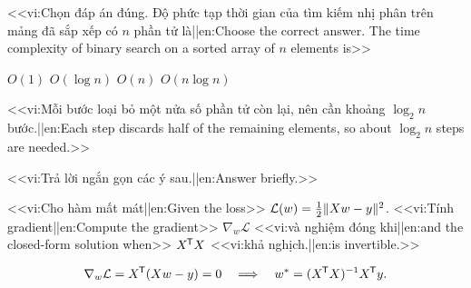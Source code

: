 \documentclass[11pt,a4paper,addpoints]{exam}
\begin{document}
\begin{questions}

\question[2]
<<vi:Chọn đáp án đúng. Độ phức tạp thời gian của tìm kiếm nhị phân trên mảng đã sắp xếp có $n$ phần tử là||en:Choose the correct answer. The time complexity of binary search on a sorted array of $n$ elements is>>
\begin{choices}
  \choice $O(1)$
  \CorrectChoice $O(\log n)$
  \choice $O(n)$
  \choice $O(n \log n)$
\end{choices}
\begin{solution}
<<vi:Mỗi bước loại bỏ một nửa số phần tử còn lại, nên cần khoảng $\log_2 n$ bước.||en:Each step discards half of the remaining elements, so about $\log_2 n$ steps are needed.>>
\end{solution}

\question <<vi:Trả lời ngắn gọn các ý sau.||en:Answer briefly.>>

\question[3]
<<vi:Cho hàm mất mát||en:Given the loss>> $\mathcal{L}(w) = \frac{1}{2}\lVert Xw - y\rVert^2$. <<vi:Tính gradient||en:Compute the gradient>> $\nabla_w \mathcal{L}$ <<vi:và nghiệm đóng khi||en:and the closed-form solution when>> $X^{\mkern-1.5mu\mathsf{T}} X$ <<vi:khả nghịch.||en:is invertible.>>
\begin{solution}
\[
  \nabla_w \mathcal{L} = X^{\mkern-1.5mu\mathsf{T}} (Xw - y) = 0 \quad\Longrightarrow\quad w^\ast = (X^{\mkern-1.5mu\mathsf{T}} X)^{-1} X^{\mkern-1.5mu\mathsf{T}} y.
\]
\end{solution}
\makeemptybox{4cm}


\end{questions}
\end{document}
